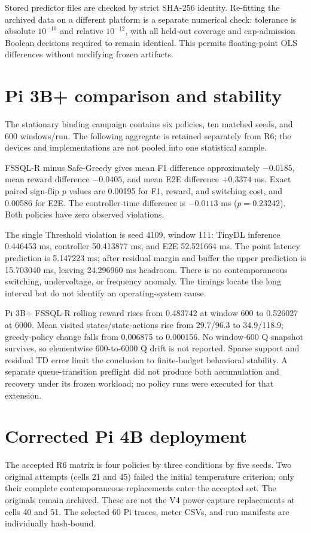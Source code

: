 \documentclass[journal]{IEEEtran}
\begin{document}
Stored predictor files are checked by strict SHA-256 identity. Re-fitting the archived data on a different platform is a separate numerical check: tolerance is absolute $10^{-10}$ and relative $10^{-12}$, with all held-out coverage and cap-admission Boolean decisions required to remain identical. This permits floating-point OLS differences without modifying frozen artifacts.

\section{Pi 3B+ comparison and stability}
The stationary binding campaign contains six policies, ten matched seeds, and 600 windows/run. The following aggregate is retained separately from R6; the devices and implementations are not pooled into one statistical sample.


FSSQL-R minus Safe-Greedy gives mean F1 difference approximately $-0.0185$, mean reward difference $-0.0405$, and mean E2E difference $+0.3374$ ms. Exact paired sign-flip $p$ values are 0.00195 for F1, reward, and switching cost, and 0.00586 for E2E. The controller-time difference is $-0.0113$ ms ($p=0.23242$). Both policies have zero observed violations.

The single Threshold violation is seed 4109, window 111: TinyDL inference 0.446453 ms, controller 50.413877 ms, and E2E 52.521664 ms. The point latency prediction is 5.147223 ms; after residual margin and buffer the upper prediction is 15.703040 ms, leaving 24.296960 ms headroom. There is no contemporaneous switching, undervoltage, or frequency anomaly. The timings locate the long interval but do not identify an operating-system cause.

Pi 3B+ FSSQL-R rolling reward rises from 0.483742 at window 600 to 0.526027 at 6000. Mean visited states/state-actions rise from 29.7/96.3 to 34.9/118.9; greedy-policy change falls from 0.006875 to 0.000156. No window-600 Q snapshot survives, so elementwise 600-to-6000 Q drift is not reported. Sparse support and residual TD error limit the conclusion to finite-budget behavioral stability. A separate queue-transition preflight did not produce both accumulation and recovery under its frozen workload; no policy runs were executed for that extension.

\section{Corrected Pi 4B deployment}
The accepted R6 matrix is four policies by three conditions by five seeds. Two original attempts (cells 21 and 45) failed the initial temperature criterion; only their complete contemporaneous replacements enter the accepted set. The originals remain archived. These are not the V4 power-capture replacements at cells 40 and 51. The selected 60 Pi traces, meter CSVs, and run manifests are individually hash-bound.
\end{document}
